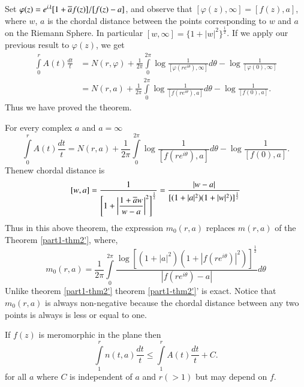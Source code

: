 Set $\varphi(z)=e^{i\lambda}[1+\overline{a}f(z)]/[f(z)-a]$, and observe that
$[\varphi(z),\infty]=[f(z),a]$, where $w$, $a$ is the chordal distance
between the points corresponding to $w$ and $a$ on the Riemann
Sphere. In particular $[w,\infty]=\{1+|w|^{2}\}^{\frac{1}{2}}$. If we
apply our previous result to $\varphi(z)$, we get
\begin{align*}
\int\limits^{r}_{0}A(t) \frac{dt}{t} &=
N(r,\varphi)+\frac{1}{2\pi}\int\limits^{2\pi}_{0}\log\frac{1}{[\varphi(re^{i\theta}),\infty]}d\theta-\log\frac{1}{[\varphi(0),\infty]}\\
&=
N(r,a)+\frac{1}{2\pi}\int\limits^{2\pi}_{0}\log\frac{1}{[f(re^{i\theta}),a]}d\theta-\log
\frac{1}{[f(0),a]}.
\end{align*}
Thus we have proved the theorem.

\setcounter{dashthm}{1}
\begin{dashthm}\label{part1-thm2'}
For every complex $a$ and $a=\infty$
$$
\int\limits^{r}_{0}A(t)\frac{dt}{t}=N(r,a)+\frac{1}{2\pi}\int\limits^{2\pi}_{0}\log
\frac{1}{[f(re^{i\theta}),a]}d\theta-\log \frac{1}{[f(0),a]}.
$$
The\pageoriginale new chordal distance is
$$
[w,a]=\frac{1}{\left[1+\left|\dfrac{1+\overline{a}w}{w-a}\right|^{2}\right]^{\frac{1}{2}}}=\frac{|w-a|}{[(1+|a|^{2})(1+|w|^{2})]^{\frac{1}{2}}} 
$$
Thus in this above theorem, the expression $m_{0}(r,a)$ replaces
$m(r,a)$ of the Theorem \ref{part1-thm2'}, where,
$$
m_{0}(r,a)=\frac{1}{2\pi}\int\limits^{2\pi}_{0}\frac{\log[(1+|a|^{2})(1+|f(re^{i\theta})|^{2})]^{\frac{1}{2}}}{|f(re^{i\theta})-a|}d\theta
$$
Unlike theorem \ref{part1-thm2'} theorem \ref{part1-thm2'}' is
exact. Notice that $m_{0}(r,a)$ is always non-negative because the
chordal distance between any two points is always is less or equal to one.
\end{dashthm}

\begin{coro*}
If $f(z)$ is meromorphic in the plane then
$$
\int\limits^{r}_{1}n(t,a)\frac{dt}{t}\leq
\int\limits^{r}_{1}A(t)\frac{dt}{t}+C.
$$
for all $a$ where $C$ is independent of $a$ and $r(>1)$ but may depend
on $f$.
\end{coro*}

